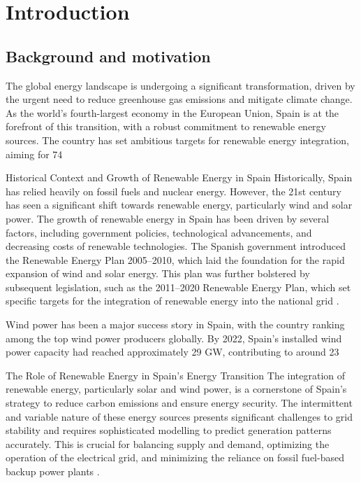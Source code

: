 \section{Introduction}
\subsection{Background and motivation}
The global energy landscape is undergoing a significant transformation, driven by the urgent need to reduce greenhouse gas emissions and mitigate climate change. As the world's fourth-largest economy in the European Union, Spain is at the forefront of this transition, with a robust commitment to renewable energy sources. The country has set ambitious targets for renewable energy integration, aiming for 74%

Historical Context and Growth of Renewable Energy in Spain
Historically, Spain has relied heavily on fossil fuels and nuclear energy. However, the 21st century has seen a significant shift towards renewable energy, particularly wind and solar power. The growth of renewable energy in Spain has been driven by several factors, including government policies, technological advancements, and decreasing costs of renewable technologies. The Spanish government introduced the Renewable Energy Plan 2005–2010, which laid the foundation for the rapid expansion of wind and solar energy. This plan was further bolstered by subsequent legislation, such as the 2011–2020 Renewable Energy Plan, which set specific targets for the integration of renewable energy into the national grid .

Wind power has been a major success story in Spain, with the country ranking among the top wind power producers globally. By 2022, Spain's installed wind power capacity had reached approximately 29 GW, contributing to around 23%

The Role of Renewable Energy in Spain’s Energy Transition
The integration of renewable energy, particularly solar and wind power, is a cornerstone of Spain's strategy to reduce carbon emissions and ensure energy security. The intermittent and variable nature of these energy sources presents significant challenges to grid stability and requires sophisticated modelling to predict generation patterns accurately. This is crucial for balancing supply and demand, optimizing the operation of the electrical grid, and minimizing the reliance on fossil fuel-based backup power plants .

